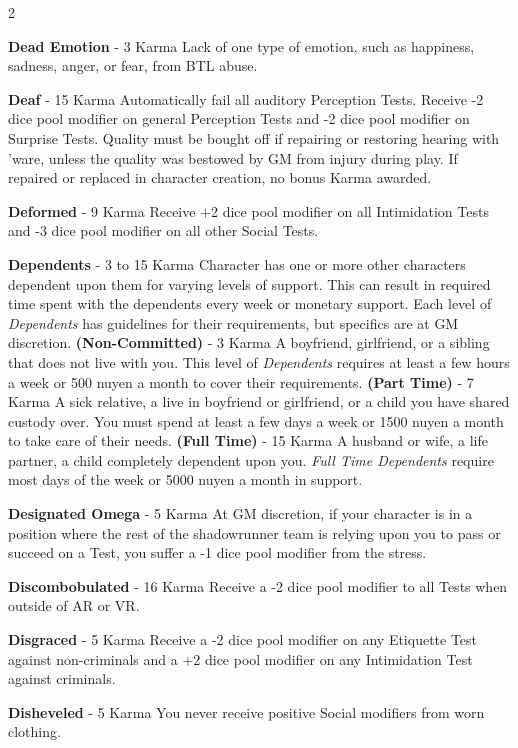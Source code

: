 \documentclass[
  oneside]{article}
\begin{document}
\begin{multicols}{2}

\textbf{Dead Emotion} - 3 Karma Lack of one type
of emotion, such as happiness, sadness, anger, or
fear, from BTL abuse.

\textbf{Deaf} - 15 Karma Automatically fail all
auditory Perception Tests. Receive -2 dice pool
modifier on general Perception Tests and -2 dice
pool modifier on Surprise Tests. Quality must be
bought off if repairing or restoring hearing with
'ware, unless the quality was bestowed by GM from
injury during play. If repaired or replaced in
character creation, no bonus Karma awarded.

\textbf{Deformed} - 9 Karma Receive +2 dice pool
modifier on all Intimidation Tests and -3 dice
pool modifier on all other Social Tests.

\textbf{Dependents} - 3 to 15 Karma Character has
one or more other characters dependent upon them
for varying levels of support. This can result in
required time spent with the dependents every week
or monetary support. Each level of
\emph{Dependents} has guidelines for their
requirements, but specifics are at GM discretion.
\textbf{(Non-Committed)} - 3 Karma A boyfriend,
girlfriend, or a sibling that does not live with
you. This level of \emph{Dependents} requires at
least a few hours a week or 500 nuyen a month to
cover their requirements. \textbf{(Part Time)} - 7
Karma A sick relative, a live in boyfriend or
girlfriend, or a child you have shared custody
over. You must spend at least a few days a week or
1500 nuyen a month to take care of their needs.
\textbf{(Full Time)} - 15 Karma A husband or wife,
a life partner, a child completely dependent upon
you. \emph{Full Time Dependents} require most days
of the week or 5000 nuyen a month in support.

\textbf{Designated Omega} - 5 Karma At GM
discretion, if your character is in a position
where the rest of the shadowrunner team is relying
upon you to pass or succeed on a Test, you suffer
a -1 dice pool modifier from the stress.

\textbf{Discombobulated} - 16 Karma Receive a -2
dice pool modifier to all Tests when outside of AR
or VR.

\textbf{Disgraced} - 5 Karma Receive a -2 dice
pool modifier on any Etiquette Test against
non-criminals and a +2 dice pool modifier on any
Intimidation Test against criminals.

\textbf{Disheveled} - 5 Karma You never receive
positive Social modifiers from worn clothing.


\end{multicols}
\end{document}
